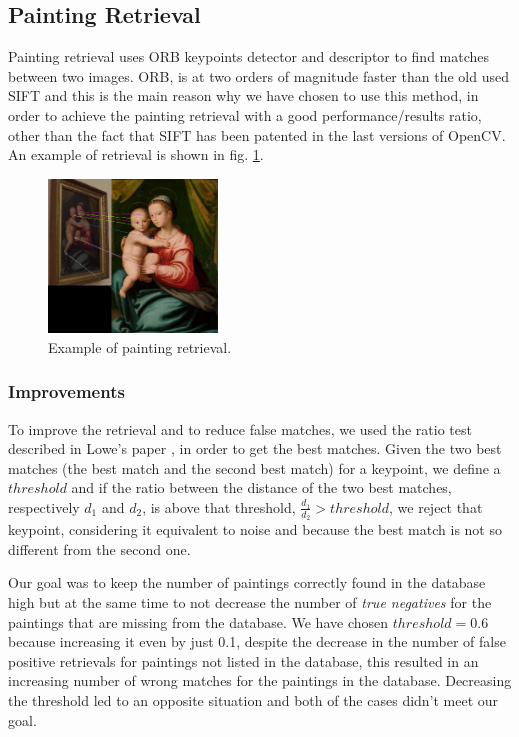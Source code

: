 \subsection{Painting Retrieval}
Painting retrieval uses ORB \cite{orb} keypoints detector and descriptor to find matches between two images. ORB, is at two orders of magnitude faster than the old used SIFT \cite{sift} and this is the main reason why we have chosen to use this method, in order to achieve the painting retrieval with a good performance/results ratio, other than the fact that SIFT has been patented in the last versions of OpenCV.
An example of retrieval is shown in fig. \ref{fig:retrieval_ex}.

\begin{figure}[h]
    \centering
    \includegraphics[width=0.4\textwidth]{pictures/painting_retrieval/retrieval}
    \caption{Example of painting retrieval.}
    \label{fig:retrieval_ex}
\end{figure}

\subsubsection{Improvements}
To improve the retrieval and to reduce false matches, we used the ratio test described in Lowe's paper \cite{sift}, in order to get the best matches. Given the two best matches (the best match and the second best match) for a keypoint, we define a \(threshold\) and if the ratio between the distance of the two best matches, respectively \(d_1\) and \(d_2\), is above that threshold, \(\frac{d_1}{d_2}>threshold\), we reject that keypoint, considering it equivalent to noise and because the best match is not so different from the second one.

Our goal was to keep the number of paintings correctly found in the database high but at the same time to not decrease the number of \emph{true negatives} for the paintings that are missing from the database. We have chosen \(threshold = 0.6\) because increasing it even by just 0.1, despite the decrease in the number of false positive retrievals for paintings not listed in the database, this resulted in an increasing number of wrong matches for the paintings in the database. Decreasing the threshold led to an opposite situation and both of the cases didn't meet our goal.

